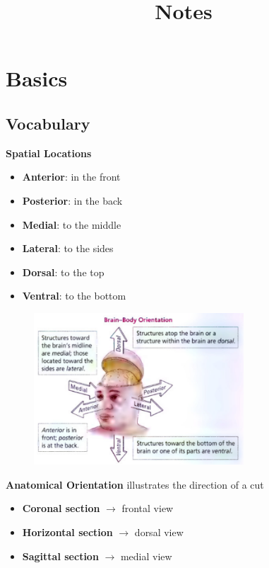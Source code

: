 \documentclass{article}
\title{Notes}
\begin{document}
\maketitle
\section{Basics}

\subsection{Vocabulary}

\textbf{Spatial Locations}
\begin{itemize}
\item {
    \textbf{Anterior}: in the front
}\item {
    \textbf{Posterior}: in the back
}\item {
    \textbf{Medial}: to the middle
}\item {
    \textbf{Lateral}: to the sides
}\item {
    \textbf{Dorsal}: to the top
}\item {
    \textbf{Ventral}: to the bottom
}
\end{itemize}

\begin{figure}[h]
    \includegraphics[width=0.7\textwidth]{../../.resources/brain_body_orientation.png}
\end{figure}

\noindent
\textbf{Anatomical Orientation}
illustrates the direction of a cut
\begin{itemize}
\item {
    \textbf{Coronal section} \(\rightarrow\) frontal view
}\item {
    \textbf{Horizontal section} \(\rightarrow\) dorsal view
}\item {
    \textbf{Sagittal section} \(\rightarrow\) medial view
}
\end{itemize}
\end{document}
